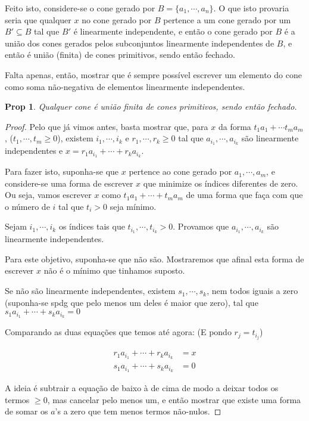 \documentclass{article}
\newtheorem{prop}{Prop}
\theoremstyle{definition}
\begin{document}
	Feito isto, considere-se o cone gerado por $B = \{a_1, \cdots, a_n\}$. O que isto provaria seria que qualquer $x$ no cone gerado por $B$ pertence a um cone gerado por um $B' \subseteq B$ tal que $B'$ é linearmente independente, e então o cone gerado por $B$ é a união dos cones gerados pelos subconjuntos linearmente independentes de $B$, e então é união (finita) de cones primitivos, sendo então fechado.
	
	Falta apenas, então, mostrar que é sempre possível escrever um elemento do cone como soma não-negativa de elementos linearmente independentes.
	
	\begin{prop}
	Qualquer cone é união finita de cones primitivos, sendo então fechado.
	\end{prop}
	
	\begin{proof}
	Pelo que já vimos antes, basta mostrar que, para $x$ da forma $t_1 a_1 + \cdots t_m a_m$, ($t_1, \cdots, t_m \geq 0$), existem $i_1, \cdots, i_k$ e $r_1, \cdots, r_k \geq 0$ tal que $a_{i_1}, \cdots, a_{i_k}$ são linearmente independentes e $x = r_1 a_{i_1} + \cdots + r_k a_{i_k}$.
	
	Para fazer isto, suponha-se que $x$ pertence ao cone gerado por $a_1, \cdots, a_m$, e considere-se uma forma de escrever $x$ que minimize os índices diferentes de zero. Ou seja, vamos escrever $x$ como $t_1 a_1 + \cdots + t_m a_m$ de uma forma que faça com que o número de $i$ tal que $t_i > 0$ seja mínimo.
	
	Sejam $i_1, \cdots, i_k$ os índices tais que $t_{i_1}, \cdots, t_{i_k} > 0$. Provamos que $a_{i_1}, \cdots, a_{i_k}$ são linearmente independentes.

	Para este objetivo, suponha-se que não são. Mostraremos que afinal esta forma de escrever $x$ não é o mínimo que tinhamos suposto.
	
	Se não são linearmente independentes, existem $s_1, \cdots, s_k$, nem todos iguais a zero (suponha-se spdg que pelo menos um deles é maior que zero), tal que $s_1 a_{i_1} + \cdots + s_k a_{i_k} = 0$
	
	Comparando as duas equações que temos até agora: (E pondo $r_j = t_{i_j}$)
	
	\begin{align*}
	r_1 a_{i_1} + \cdots + r_k a_{i_k} &= x \\
	s_1 a_{i_1} + \cdots + s_k a_{i_k} &= 0
	\end{align*}
	
	A ideia é subtrair a equação de baixo à de cima de modo a deixar todos os termos $\geq 0$, mas cancelar pelo menos um, e então mostrar que existe uma forma de somar os $a$'s a zero que tem menos termos não-nulos.
	

\end{proof}
\end{document}
